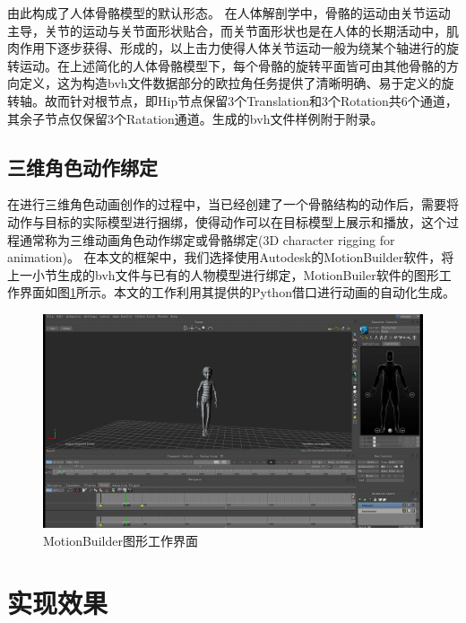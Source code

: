 由此构成了人体骨骼模型的默认形态。
在人体解剖学中，骨骼的运动由关节运动主导，关节的运动与关节面形状贴合，而关节面形状也是在人体的长期活动中，肌肉作用下逐步获得、形成的，以上击力使得人体关节运动一般为绕某个轴进行的旋转运动。在上述简化的人体骨骼模型下，每个骨骼的旋转平面皆可由其他骨骼的方向定义，这为构造bvh文件数据部分的欧拉角任务提供了清晰明确、易于定义的旋转轴。故而针对根节点，即Hip节点保留3个Translation和3个Rotation共6个通道，其余子节点仅保留3个Ratation通道。生成的bvh文件样例附于附录。

\subsection{三维角色动作绑定}{}
在进行三维角色动画创作的过程中，当已经创建了一个骨骼结构的动作后，需要将动作与目标的实际模型进行捆绑，使得动作可以在目标模型上展示和播放，这个过程通常称为三维动画角色动作绑定或骨骼绑定(3D character rigging for animation)。
在本文的框架中，我们选择使用Autodesk的MotionBuilder软件，将上一小节生成的bvh文件与已有的人物模型进行绑定，MotionBuiler软件的图形工作界面如图\ref{fig:f28}所示。本文的工作利用其提供的Python借口进行动画的自动化生成。
\begin{figure}[h]
	\centering
	\includegraphics[scale=0.3]{figures/28.png}
	\caption{MotionBuilder图形工作界面}
	\label{fig:f28}
\end{figure}


\section{实现效果}

